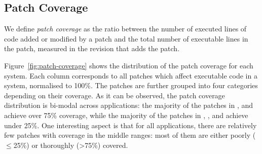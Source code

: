 \subsection{Patch Coverage}
\label{sec:pcoverage}
\label{sec:lpcoverage}

\begin{question}
  \rqsix
\end{question}

We define {\em patch coverage} as the ratio between the number of
executed lines of code added or modified by a patch and the total
number of executable lines in the patch, measured in the revision that
adds the patch.

Figure~\ref{fig:patch-coverage} shows the distribution of the patch coverage for each
system. Each column corresponds to all patches which affect executable
code in a system, normalised to 100\%. The patches are further grouped into
four categories depending on their coverage.
As it can be observed, the patch coverage distribution is
bi-modal across applications: the majority of the patches
in \git, \memcached and \zeromq achieve over 75\% coverage, while the
majority of the patches in \beanstalkd, \binutils, \lighttpdtwo and \redis achieve
under 25\%.  One interesting aspect is that for all applications,
there are relatively few patches with coverage in the middle ranges:
most of them are either poorly ($\le$25\%) or thoroughly (\textgreater75\%)
covered.

